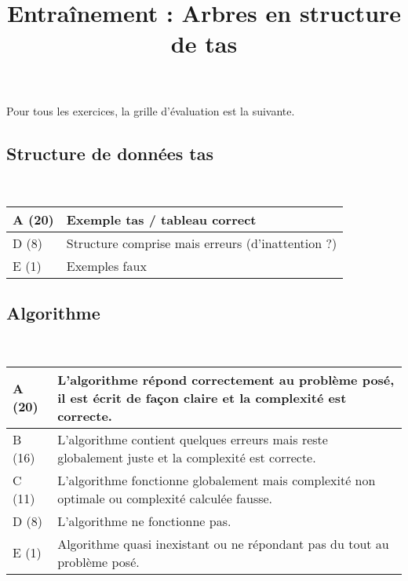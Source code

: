 \documentclass{../cours}
\title{Entraînement : Arbres en structure de tas}
\begin{document}
\maketitle

Pour tous les exercices, la grille d'évaluation est la suivante.

\subsection*{Structure de données tas}~

\begin{tabular}{|l|p{12cm}|}
\hline
A (20) & \small{Exemple tas / tableau correct} \\ \hline
D (8) & \small{Structure comprise mais erreurs (d’inattention ?)} \\ \hline
E (1) & \small{Exemples faux} \\ \hline
\end{tabular}

\subsection*{Algorithme}~

\begin{tabular}{|l|p{12cm}|}
\hline
A (20) & \small{L'algorithme répond correctement au problème posé, il est écrit de façon claire et la complexité est correcte.} \\ \hline
B (16) & \small{L'algorithme contient quelques erreurs mais reste globalement juste et la complexité est correcte.} \\ \hline
C (11) & \small{L'algorithme fonctionne globalement mais complexité non optimale ou complexité calculée fausse.} \\ \hline
D (8) & \small{L'algorithme ne fonctionne pas.} \\ \hline
E (1) & \small{Algorithme quasi inexistant ou ne répondant pas du tout au problème posé.} \\ \hline
\end{tabular}





\end{document}
